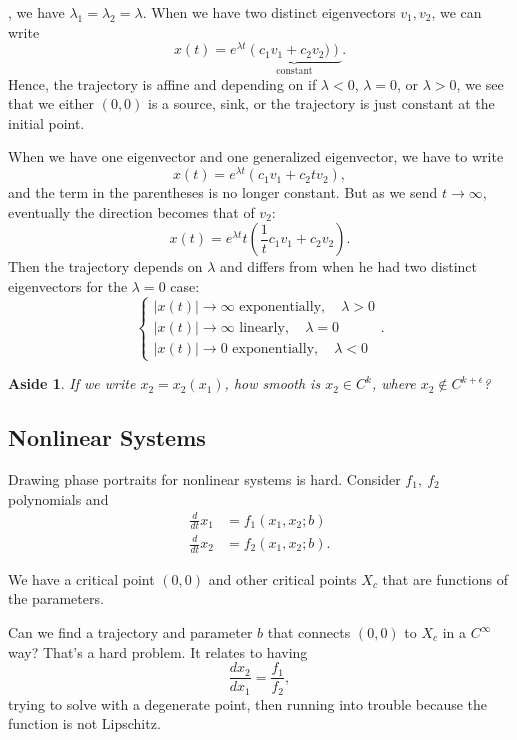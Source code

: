 \documentclass{tufte-handout}
\newtheorem{aside}[thm]{Aside}
\theoremstyle{definition}
\begin{document}
, we have $\lambda_1 = \lambda_2 = \lambda$. When we have two distinct eigenvectors $v_1,v_2$, we can write \[
	x(t) = e^{\lambda t} \underbrace{\left( c_1v_1 + c_2v_2) \right)}_{\text{constant}}
.\] Hence, the trajectory is affine and depending on if $\lambda < 0$, $\lambda = 0$, or $\lambda > 0$, we see that we either $(0,0)$ is a source, sink, or the trajectory is just constant at the initial point.

When we have one eigenvector and one generalized eigenvector, we have to write \[
	x(t) = e^{\lambda t} (c_1v_1 + c_2 t v_2)
,\]  and the term in the parentheses is no longer constant. But as we send $t \to \infty$, eventually the direction becomes that of $v_2$: \[
	x(t) = e^{\lambda t} t \left( \frac{1}{t}c_1v_1 + c_2v_2 \right)
.\] Then the trajectory depends on $\lambda$ and differs from when he had two distinct eigenvectors for the $\lambda = 0$ case: \[
	\begin{cases}
		\left| x(t) \right| \to \infty \text{ exponentially}, \quad \lambda > 0 \\
		\left| x(t)  \right| \to \infty \text{ linearly}, \quad \lambda = 0 \\
		\left| x(t) \right| \to 0 \text{ exponentially}, \quad \lambda < 0
	\end{cases}
.\] 

\begin{aside}
	If we write $x_2 = x_2\left( x_1 \right)$, how smooth is $x_2 \in C^k$, where $x_2 \not\in C^{k + \epsilon}$?
\end{aside}

\subsection{Nonlinear Systems}
Drawing phase portraits for nonlinear systems is hard. Consider $f_1,\ f_2$ polynomials and
\begin{align*}
	\frac{d}{dt}x_1 &= f_1(x_1,x_2; b) \\
	\frac{d}{dt}x_2 &= f_2(x_1,x_2; b)
.\end{align*}

We have a critical point $(0,0)$ and other critical points $X_c$ that are functions of the parameters.

Can we find a trajectory and parameter $b$ that connects $(0,0)$ to $X_c$ in a $C^{\infty}$ way? That's a hard problem. It relates to having \[
	\frac{dx_2}{dx_1} = \frac{f_1}{f_2}
,\] trying to solve with a degenerate point, then running into trouble because the function is not Lipschitz.
\end{document}
